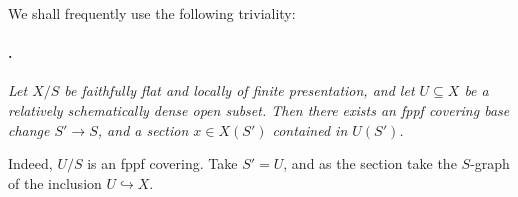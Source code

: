 We shall frequently use the following triviality:

\paragraph{.}
\textit{Let \(X/S\) be faithfully flat and locally of finite
presentation, and let \(U\subseteq X\) be a relatively schematically
dense open subset. Then there exists an fppf covering base change
\(S'\to S\), and a section \(x\in X(S')\) contained in \(U(S')\).}

Indeed, \(U/S\) is an fppf covering. Take \(S'=U\), and as the section
take the \(S\)-graph of the inclusion \(U\hookrightarrow X\).
